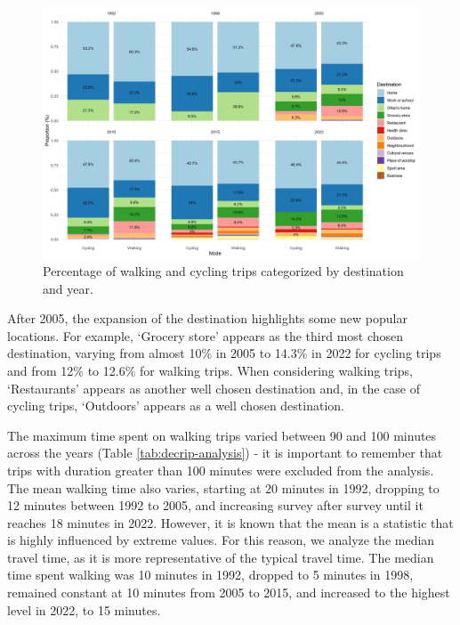 \documentclass[preprint, 3p,
authoryear]{elsarticle} %
\begin{document}
\begin{figure}
\includegraphics[width=1\linewidth]{figures/destination_percentual} \caption{Percentage of walking and cycling trips categorized by destination and year.}\label{fig:figure-destmodeyearperc}
\end{figure}

After 2005, the expansion of the destination highlights some new popular
locations. For example, `Grocery store' appears as the third most chosen
destination, varying from almost 10\% in 2005 to 14.3\% in 2022 for
cycling trips and from 12\% to 12.6\% for walking trips. When
considering walking trips, `Restaurants' appears as another well chosen
destination and, in the case of cycling trips, `Outdoors' appears as a
well chosen destination.

The maximum time spent on walking trips varied between 90 and 100
minutes across the years (Table \ref{tab:decrip-analysis}) - it is
important to remember that trips with duration greater than 100 minutes
were excluded from the analysis. The mean walking time also varies,
starting at 20 minutes in 1992, dropping to 12 minutes between 1992 to
2005, and increasing survey after survey until it reaches 18 minutes in
2022. However, it is known that the mean is a statistic that is highly
influenced by extreme values. For this reason, we analyze the median
travel time, as it is more representative of the typical travel time.
The median time spent walking was 10 minutes in 1992, dropped to 5
minutes in 1998, remained constant at 10 minutes from 2005 to 2015, and
increased to the highest level in 2022, to 15 minutes.
\end{document}
